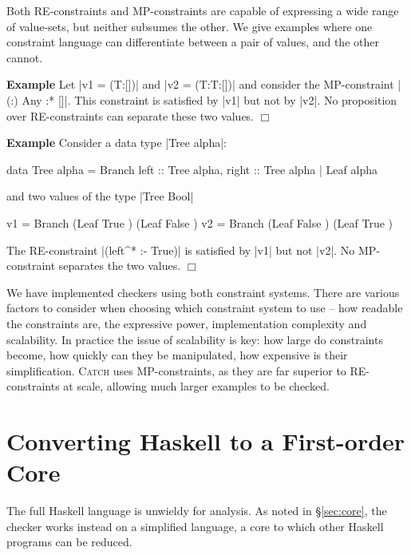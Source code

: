 \documentclass[preprint]{sigplanconf}
\newcommand{\catch}{\textsc{Catch}}
\newcommand{\newtool}{\anon{\catch07}{\catch}}
\newcounter{exmp}
\newcommand{\yesexample}{\addtocounter{exmp}{1}\addvspace{2mm}\noindent\textbf{Example \arabic{exmp}}}
\newcommand{\noexample}{\hfill$\Box$\par\addvspace{2mm}}
\newcommand{\anon}[2]{#2}
\newenvironment{example}{\yesexample}{\noexample}
\begin{document}
Both RE-constraints and MP-constraints are capable of expressing a wide range of value-sets, but neither subsumes the other. We give examples where one constraint language can differentiate between a pair of values, and the other cannot.

\begin{example}
Let |v1 = (T:[])| and |v2 = (T:T:[])| and consider the MP-constraint |{(:) Any} :* {[]}|. This constraint is satisfied by |v1| but not by |v2|. No proposition over RE-constraints can separate these two values.
\end{example}

\begin{example}
Consider a data type |Tree alpha|:

\begin{code}
data Tree alpha  =  Branch {left :: Tree alpha, right :: Tree alpha}
                 |  Leaf alpha
\end{code}

\noindent and two values of the type |Tree Bool|

\begin{code}
v1 = Branch (Leaf True   ) (Leaf False  )
v2 = Branch (Leaf False  ) (Leaf True   )
\end{code}

\noindent The RE-constraint |(left^* :- True)| is satisfied by |v1| but not |v2|. No MP-constraint separates the two values.
\end{example}

We have implemented checkers using both constraint systems. There are various factors to consider when choosing which constraint system to use -- how readable the constraints are, the expressive power, implementation complexity and scalability. In practice the issue of scalability is key: how large do constraints become, how quickly can they be manipulated, how expensive is their simplification. \newtool{} uses MP-constraints, as they are far superior to RE-constraints at scale, allowing much larger examples to be checked.

\section{Converting Haskell to a First-order Core}
\label{sec:transform}

The full Haskell language is unwieldy for analysis. As noted in \S\ref{sec:core}, the checker works instead on a simplified language, a core to which other Haskell programs can be reduced.
\end{document}
